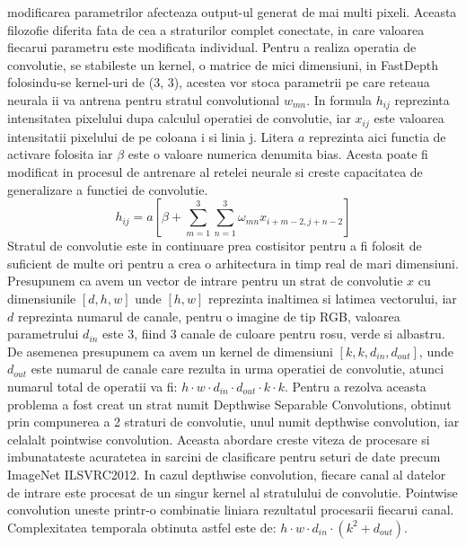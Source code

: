 \documentclass[12pt,a4paper]{report}
\begin{document}
modificarea parametrilor afecteaza output-ul generat de mai multi pixeli. Aceasta filozofie
diferita fata de cea a straturilor complet conectate, in care valoarea fiecarui parametru este
modificata individual. Pentru a realiza operatia de convolutie, se stabileste un kernel, o
matrice de  mici dimensiuni, in FastDepth folosindu-se kernel-uri de (3, 3), acestea vor stoca
parametrii pe care reteaua neurala ii va antrena pentru stratul convolutional \(w_{mn}\). In 
formula \(h_{ij}\) reprezinta intensitatea pixelului dupa calculul operatiei de convolutie, 
iar \(x_{ij}\) este valoarea intensitatii pixelului de pe coloana i si linia j.  
Litera \(a\) reprezinta aici functia de activare folosita iar \(\beta\) este o valoare numerica
denumita bias. Acesta poate fi modificat in procesul de antrenare al retelei neurale si creste
capacitatea de generalizare a functiei de convolutie.  
\begin{equation}
h_{ij} = a \left[ \beta + \sum_{m=1}^{3} \sum_{n=1}^{3} \omega_{mn} x_{i+m-2, j+n-2} \right]
\end{equation}
Stratul de convolutie este in continuare prea costisitor pentru a fi folosit de suficient de 
multe ori pentru a crea o arhitectura in timp real de mari dimensiuni. Presupunem ca avem 
un vector de intrare pentru un strat de convolutie \(x\) cu dimensiunile \([d, h, w]\) unde
\([h,w]\) reprezinta inaltimea si latimea vectorului, iar \(d\) reprezinta numarul de canale,
pentru o imagine de tip RGB, valoarea parametrului \(d_{in}\) este 3, fiind 3 canale de culoare pentru
rosu, verde si albastru. De asemenea presupunem ca avem un kernel de dimensiuni \([k, k, d_{in}, d_{out}]\),
unde \(d_{out}\) este numarul de canale care rezulta in urma operatiei de convolutie, atunci
numarul total de operatii va fi: $ h \cdot w \cdot d_{in} \cdot d_{out} \cdot k \cdot k$. Pentru 
a rezolva aceasta problema a fost creat un strat numit Depthwise Separable Convolutions, 
obtinut prin compunerea a 2 straturi de convolutie, unul numit depthwise convolution,
iar celalalt pointwise convolution. Aceasta abordare creste viteza de procesare si imbunatateste
acuratetea in sarcini de clasificare pentru seturi de date precum ImageNet ILSVRC2012. In cazul 
depthwise convolution, fiecare canal al datelor de intrare este procesat de un singur kernel
al stratulului de convolutie. Pointwise convolution uneste printr-o combinatie liniara 
rezultatul procesarii fiecarui canal. Complexitatea temporala obtinuta astfel este de:
$ h \cdot w \cdot d_{in} \cdot (k^2   + d_{out})$. \\ 
\end{document}

